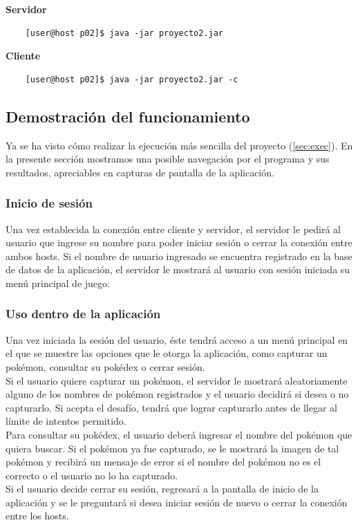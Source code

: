 \documentclass[12pt]{article}
\begin{document}
\noindent
\textbf{Servidor}\\
\begin{verbatim}
    [user@host p02]$ java -jar proyecto2.jar
\end{verbatim}
\textbf{Cliente}
\begin{verbatim}
    [user@host p02]$ java -jar proyecto2.jar -c
\end{verbatim}

\subsection{Demostración del funcionamiento}
Ya se ha visto cómo realizar la ejecución más sencilla del proyecto (\ref{sec:exec}). En la presente sección mostramos una posible navegación por el programa y sus resultados, apreciables en capturas de pantalla de la aplicación.
\subsubsection{Inicio de sesión}
Una vez establecida la conexión entre cliente y servidor, el servidor le pedirá al usuario que ingrese su nombre para poder iniciar sesión o cerrar la conexión entre ambos hosts. Si el nombre de usuario ingresado se encuentra registrado en la base de datos de la aplicación, el servidor le mostrará al usuario con sesión iniciada su menú principal de juego.

\subsubsection{Uso dentro de la aplicación}
Una vez iniciada la sesión del usuario, éste tendrá acceso a un menú principal en el que se muestre las opciones que le otorga la aplicación, como capturar un pokémon, consultar su pokédex o cerrar sesión. \\

Si el usuario quiere capturar un pokémon, el servidor le mostrará aleatoriamente alguno de los nombres de pokémon registrados y el usuario decidirá si desea o no capturarlo. Si acepta el desafío, tendrá que lograr capturarlo antes de llegar al límite de intentos permitido. \\

Para consultar su pokédex, el usuario deberá ingresar el nombre del pokémon que quiera buscar. Si el pokémon ya fue capturado, se le mostrará la imagen de tal pokémon y recibirá un mensaje de error si el nombre del pokémon no es el correcto o el usuario no lo ha capturado. \\

Si el usuario decide cerrar su sesión, regresará a la pantalla de inicio de la aplicación y se le preguntará si desea iniciar sesión de nuevo o cerrar la conexión entre los hosts. \\
\end{document}
